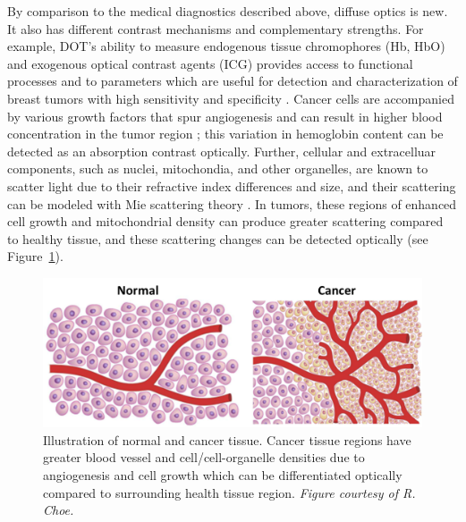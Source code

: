 By comparison to the medical diagnostics described above, diffuse optics is new. It also has different contrast mechanisms and complementary strengths. For example, DOT's ability to measure endogenous tissue chromophores (Hb, HbO) and exogenous optical contrast agents (ICG) provides access to functional processes and to parameters which are useful for detection and characterization of breast tumors with high sensitivity and specificity \cite{Zhao2015,Choe2009}. Cancer cells are accompanied by various growth factors that spur angiogenesis and can result in higher blood concentration in the tumor region \cite{Weidner1992,Thomsen1998,Zhu2003}; this variation in hemoglobin content can be detected as an absorption contrast optically. Further, cellular and extracelluar components, such as nuclei, mitochondia, and other organelles, are known to scatter light due to their refractive index differences and size, and their scattering can be modeled with Mie scattering theory \cite{Flock1987,Thomsen1990}. In tumors, these regions of enhanced cell growth and mitochondrial density can produce greater scattering compared to healthy tissue, and these scattering changes can be detected optically (see Figure~\ref{fig:cancercells}).
\begin{figure}[t]
\centering
\includegraphics[width=14cm]{./figures/1_Introduction/cancercells.png}
\caption[Illustration of normal and cancer tissue]{Illustration of normal and cancer tissue. Cancer tissue regions have greater blood vessel and cell/cell-organelle densities due to angiogenesis and cell growth which can be differentiated optically compared to surrounding health tissue region. \textit{Figure courtesy of R. Choe.}\cite{Choe2005}}
\label{fig:cancercells}
\end{figure}

